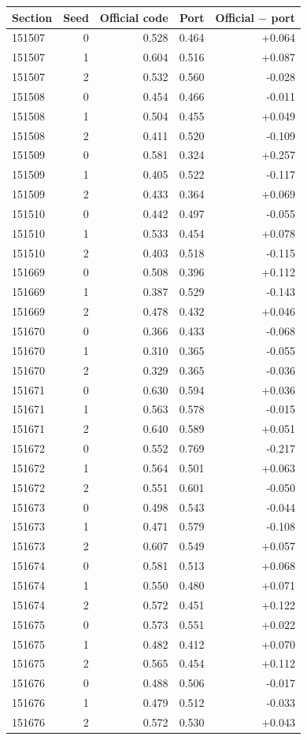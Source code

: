 \begin{tabular}{lrrrr}\toprule
Section & Seed & Official code & Port & Official $-$ port \\\midrule
151507 & 0 & 0.528 & 0.464 & +0.064 \\
151507 & 1 & 0.604 & 0.516 & +0.087 \\
151507 & 2 & 0.532 & 0.560 & -0.028 \\
151508 & 0 & 0.454 & 0.466 & -0.011 \\
151508 & 1 & 0.504 & 0.455 & +0.049 \\
151508 & 2 & 0.411 & 0.520 & -0.109 \\
151509 & 0 & 0.581 & 0.324 & +0.257 \\
151509 & 1 & 0.405 & 0.522 & -0.117 \\
151509 & 2 & 0.433 & 0.364 & +0.069 \\
151510 & 0 & 0.442 & 0.497 & -0.055 \\
151510 & 1 & 0.533 & 0.454 & +0.078 \\
151510 & 2 & 0.403 & 0.518 & -0.115 \\
151669 & 0 & 0.508 & 0.396 & +0.112 \\
151669 & 1 & 0.387 & 0.529 & -0.143 \\
151669 & 2 & 0.478 & 0.432 & +0.046 \\
151670 & 0 & 0.366 & 0.433 & -0.068 \\
151670 & 1 & 0.310 & 0.365 & -0.055 \\
151670 & 2 & 0.329 & 0.365 & -0.036 \\
151671 & 0 & 0.630 & 0.594 & +0.036 \\
151671 & 1 & 0.563 & 0.578 & -0.015 \\
151671 & 2 & 0.640 & 0.589 & +0.051 \\
151672 & 0 & 0.552 & 0.769 & -0.217 \\
151672 & 1 & 0.564 & 0.501 & +0.063 \\
151672 & 2 & 0.551 & 0.601 & -0.050 \\
151673 & 0 & 0.498 & 0.543 & -0.044 \\
151673 & 1 & 0.471 & 0.579 & -0.108 \\
151673 & 2 & 0.607 & 0.549 & +0.057 \\
151674 & 0 & 0.581 & 0.513 & +0.068 \\
151674 & 1 & 0.550 & 0.480 & +0.071 \\
151674 & 2 & 0.572 & 0.451 & +0.122 \\
151675 & 0 & 0.573 & 0.551 & +0.022 \\
151675 & 1 & 0.482 & 0.412 & +0.070 \\
151675 & 2 & 0.565 & 0.454 & +0.112 \\
151676 & 0 & 0.488 & 0.506 & -0.017 \\
151676 & 1 & 0.479 & 0.512 & -0.033 \\
151676 & 2 & 0.572 & 0.530 & +0.043 \\
\bottomrule\end{tabular}
